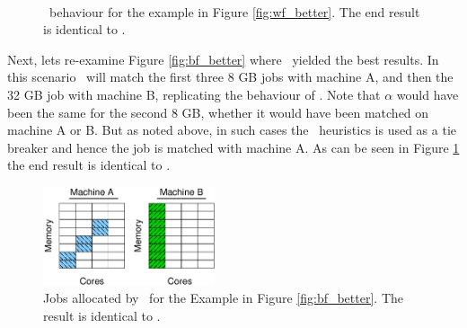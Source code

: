 \begin{figure}\centering
{}
~~~~
\caption{\mif\ behaviour for the example in Figure \ref{fig:wf_better}.
  The end result is identical to \wof.}
\end{figure}


Next, lets re-examine Figure \ref{fig:bf_better} where \bef\ yielded the
best results.
In this scenario \mif\ will match the first three 8 GB jobs with
machine A, and then the 32 GB job with machine B, replicating the
behaviour of \bef.
Note that $\alpha$ would have been the same for the second 8 GB,
whether it would have been matched on machine A or B.
But as noted above, in such cases the \fif\ heuristics is used as a
tie breaker and hence the job is matched with machine A.
As can be seen in Figure \ref{fig:mf_final2} the end result is
identical to \bef.

\begin{figure}\centering
	\includegraphics[width=0.45\textwidth]{figures/fig2b.eps}
\caption{Jobs allocated by \mif\ for the Example in Figure
  \ref{fig:bf_better}.
  The result is identical to \bef.}
\label{fig:mf_final2}
\end{figure}


